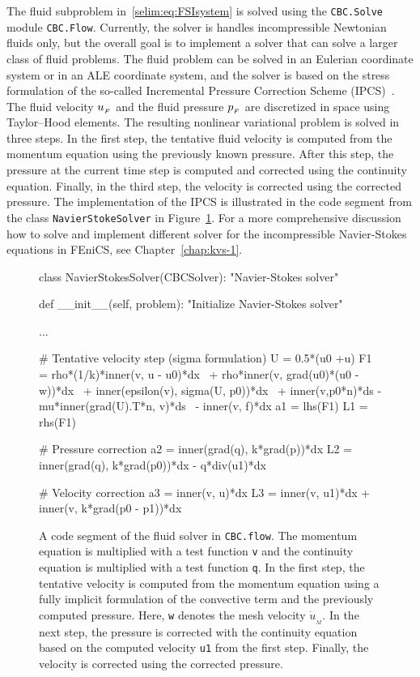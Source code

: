The fluid subproblem in~\eqref{selim:eq:FSIsystem} is solved using the
\texttt{CBC.Solve} module \texttt{CBC.Flow}. Currently, the solver is
handles incompressible Newtonian fluids only, but the overall
goal is to implement a solver that can solve a larger class of fluid
problems.  The fluid problem can be solved in an Eulerian coordinate
system or in an ALE coordinate system, and the solver is
based on the stress formulation of the so-called Incremental
Pressure Correction Scheme (IPCS)~\cite{Goda1979}. The fluid
velocity $u_{_{F}}$ and the fluid pressure $p_{_{F}}$ are discretized in
space using Taylor--Hood elements. The resulting nonlinear variational
problem is solved in three steps. In the first step, the tentative
fluid velocity is computed from the momentum equation using the
previously known pressure. After this step, the pressure at the
current time step is computed and corrected using the continuity
equation. Finally, in the third step, the velocity is corrected using the
corrected pressure.  The implementation of the IPCS is illustrated in
the code segment from the class \texttt{NavierStokeSolver} in
Figure~\ref{selim:fig:fluidsolver}. For a more comprehensive discussion
how to solve and implement different solver for the incompressible
Navier-Stokes equations in FEniCS, see Chapter~\ref{chap:kvs-1}.
\begin{figure}
\begin{center}
\begin{python}
 class NavierStokesSolver(CBCSolver):
    "Navier-Stokes solver"

   def __init__(self, problem):
        "Initialize Navier-Stokes solver"

        ...

        # Tentative velocity step (sigma formulation)
        U = 0.5*(u0 +u)
        F1 = rho*(1/k)*inner(v, u - u0)*dx \
           + rho*inner(v, grad(u0)*(u0 - w))*dx \
           + inner(epsilon(v), sigma(U, p0))*dx \
           + inner(v,p0*n)*ds - mu*inner(grad(U).T*n, v)*ds \
           - inner(v, f)*dx
        a1 = lhs(F1)
        L1 = rhs(F1)

        # Pressure correction
        a2 = inner(grad(q), k*grad(p))*dx
        L2 = inner(grad(q), k*grad(p0))*dx - q*div(u1)*dx

        # Velocity correction
        a3 = inner(v, u)*dx
        L3 = inner(v, u1)*dx + inner(v, k*grad(p0 - p1))*dx
\end{python}
\caption{A code segment of the fluid solver in \texttt{CBC.flow}. The
  momentum equation is multiplied with a test function \texttt{v} and
  the continuity equation is multiplied with a test function
  \texttt{q}. In the first step, the tentative velocity is computed
  from the momentum equation using a fully implicit formulation of the
  convective term and the previously computed pressure. Here, \texttt{w}
  denotes the mesh velocity $\dot{u}_{_{M}}$. In the next step, the
  pressure is corrected with the continuity equation based on the
  computed velocity \texttt{u1} from the first step. Finally, the
  velocity is corrected using the corrected pressure.}
\label{selim:fig:fluidsolver}
\end{center}
\end{figure}

